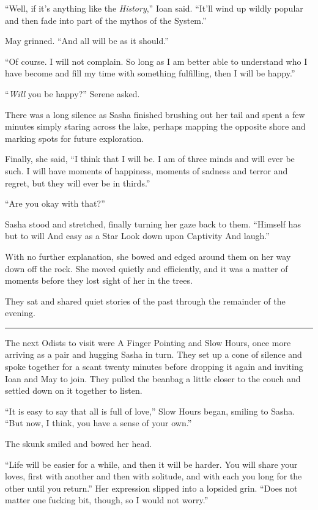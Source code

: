 ``Well, if it's anything like the \emph{History},'' Ioan said. ``It'll wind up wildly popular and then fade into part of the mythos of the System.''

May grinned. ``And all will be as it should.''

``Of course. I will not complain. So long as I am better able to understand who I have become and fill my time with something fulfilling, then I will be happy.''

``\emph{Will} you be happy?'' Serene asked.

There was a long silence as Sasha finished brushing out her tail and spent a few minutes simply staring across the lake, perhaps mapping the opposite shore and marking spots for future exploration.

Finally, she said, ``I think that I will be. I am of three minds and will ever be such. I will have moments of happiness, moments of sadness and terror and regret, but they will ever be in thirds.''

``Are you okay with that?''

Sasha stood and stretched, finally turning her gaze back to them. ``Himself has but to will And easy as a Star Look down upon Captivity And laugh.''

With no further explanation, she bowed and edged around them on her way down off the rock. She moved quietly and efficiently, and it was a matter of moments before they lost sight of her in the trees.

They sat and shared quiet stories of the past through the remainder of the evening.

\begin{center}\rule{0.5\linewidth}{0.5pt}\end{center}

The next Odists to visit were A Finger Pointing and Slow Hours, once more arriving as a pair and hugging Sasha in turn. They set up a cone of silence and spoke together for a scant twenty minutes before dropping it again and inviting Ioan and May to join. They pulled the beanbag a little closer to the couch and settled down on it together to listen.

``It is easy to say that all is full of love,'' Slow Hours began, smiling to Sasha. ``But now, I think, you have a sense of your own.''

The skunk smiled and bowed her head.

``Life will be easier for a while, and then it will be harder. You will share your loves, first with another and then with solitude, and with each you long for the other until you return.'' Her expression slipped into a lopsided grin. ``Does not matter one fucking bit, though, so I would not worry.''

